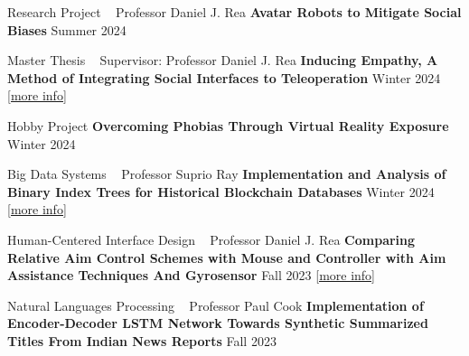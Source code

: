 
\begin{cventries}

    \cventry
    {Research Project ~ Professor Daniel J. Rea}
    {\textbf {Avatar Robots to Mitigate Social Biases}}
    {}
    {Summer 2024}
    {}
    \vspace{0.35 cm}
  
    \cventry
    {Master Thesis ~ Supervisor: Professor Daniel J. Rea}
    {\textbf {Inducing Empathy, A Method of Integrating Social Interfaces to Teleoperation}}
    {}
    {Winter 2024}
    {}
    {\href{https://github.com/ph504/Teleoperation-Interface}{\textcolor{cobalt}{[more info]}}\newline}
    \vspace{0.35 cm}
  
    \cventry
    {Hobby Project}
    {\textbf {Overcoming Phobias Through Virtual Reality Exposure}}
    {}
    {Winter 2024}
    {}
    \vspace{0.35 cm}


    \cventry
    {Big Data Systems ~ Professor Suprio Ray}
    {\textbf {Implementation and Analysis of Binary Index Trees for Historical Blockchain Databases}}
    {}
    {Winter 2024}
    {\href{https://github.com/ph504/Teleoperation-Interface}{\textcolor{cobalt}{[more info]}}\newline}
    \vspace{0.35 cm}
  

    \cventry
    {Human-Centered Interface Design ~ Professor Daniel J. Rea}
    {\textbf {Comparing Relative Aim Control Schemes with Mouse and Controller with Aim Assistance Techniques And Gyrosensor}}
    {}
    {Fall 2023}
    {\href{https://github.com/ph504/Teleoperation-Interface}{\textcolor{cobalt}{[more info]}}\newline}
    \vspace{0.35 cm}


    \cventry
    {Natural Languages Processing ~ Professor Paul Cook}
    {\textbf {Implementation of Encoder-Decoder LSTM Network Towards Synthetic Summarized Titles From Indian News Reports}}
    {}
    {Fall 2023}
    {}
    \vspace{0.35 cm}
  

\end{cventries}
